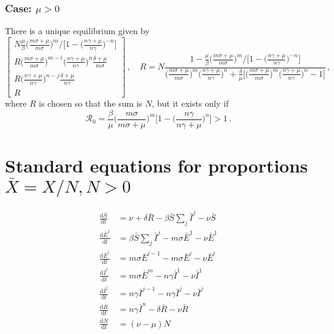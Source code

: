 \documentclass[fleqn]{article}
\begin{document}
\subsubsection{Case: $\mu > 0$}

There is a unique equilibrium given by
\begin{equation}
\begin{bmatrix}
  N \frac{\mu}{\beta} \big(\frac{m \sigma + \mu}{m \sigma}\big)^{m} \big/ \big[1 - \big(\frac{n \gamma + \mu}{n \gamma}\big)^{-n}\big] \\
  R \big(\frac{m \sigma + \mu}{m \sigma}\big)^{m - i} \big(\frac{n \gamma + \mu}{n \gamma}\big)^{n} \frac{\delta + \mu}{m \sigma} \\
  R \big(\frac{n \gamma + \mu}{n \gamma}\big)^{n - j} \frac{\delta + \mu}{n \gamma} \\
  R
\end{bmatrix}
\,,\quad
R = N \frac{1 - \frac{\mu}{\beta} \big(\frac{m \sigma + \mu}{m \sigma}\big)^{m} \big/ \big[1 - \big(\frac{n \gamma + \mu}{n \gamma}\big)^{-n}\big]}{\big(\frac{m \sigma + \mu}{m \sigma}\big)^{m} \big(\frac{n \gamma + \mu}{n \gamma}\big)^{n} + \frac{\delta}{\mu} \big[\big(\frac{m \sigma + \mu}{m \sigma}\big)^{m} \big(\frac{n \gamma + \mu}{n \gamma}\big)^{n} - 1\big]}\,,
\end{equation}
where $R$ is chosen so that the sum is $N$, but it exists only if
\begin{equation}
\mathcal{R}_{0} = \frac{\beta}{\mu} \Big(\frac{m \sigma}{m \sigma + \mu}\Big)^{m} \Big[1 - \Big(\frac{n \gamma}{n \gamma + \mu}\Big)^{n}\Big] > 1\,.
\end{equation}
\clearpage


\section{Standard equations for proportions $\bar{X} = X/N, N > 0$}

\begin{subequations}
\begin{align}
  \frac{\text{d} \bar{S}    }{\text{d} t}
  &= \nu + \delta \bar{R} - \beta \bar{S} \sum\nolimits_{j} \bar{I}^{j} - \nu \bar{S} \\
  \frac{\text{d} \bar{E}^{1}}{\text{d} t}
  &= \beta \bar{S} \sum\nolimits_{j} \bar{I}^{j} - m \sigma \bar{E}^{1} - \nu \bar{E}^{1} \\
  \frac{\text{d} \bar{E}^{i}}{\text{d} t}
  &= m \sigma \bar{E}^{i-1} - m \sigma \bar{E}^{i} - \nu \bar{E}^{i} \\
  \frac{\text{d} \bar{I}^{1}}{\text{d} t}
  &= m \sigma \bar{E}^{m} - n \gamma \bar{I}^{1} - \nu \bar{I}^{1} \\
  \frac{\text{d} \bar{I}^{j}}{\text{d} t}
  &= n \gamma \bar{I}^{j-1} - n \gamma \bar{I}^{j} - \nu \bar{I}^{j} \\
  \frac{\text{d} \bar{R}    }{\text{d} t}
  &= n \gamma \bar{I}^{n} - \delta \bar{R} - \nu \bar{R} \\
  \frac{\text{d}      N     }{\text{d} t}
  &= (\nu - \mu) N
\end{align}
\end{subequations}
\end{document}
